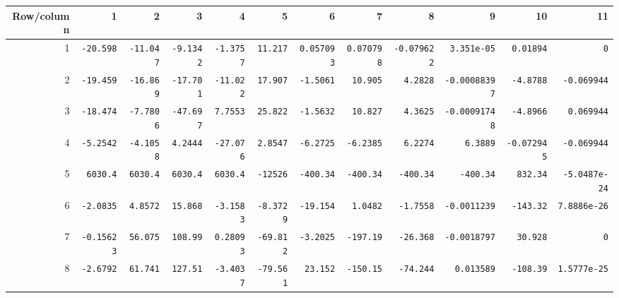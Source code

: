 \begin{landscape}
\begingroup\scriptsize\setlength{\tabcolsep}{3pt}\centering
\begin{tabular}{rrrrrrrrrrrr}\toprule

Row/column & 1 & 2 & 3 & 4 & 5 & 6 & 7 & 8 & 9 & 10 & 11 \\ \midrule

1 & \texttt{-20.598} & \texttt{-11.047} & \texttt{-9.1342} & \texttt{-1.3757} & \texttt{11.217} & \texttt{0.057093} & \texttt{0.070798} & \texttt{-0.079622} & \texttt{3.351e-05} & \texttt{0.01894} & \texttt{0} \\

2 & \texttt{-19.459} & \texttt{-16.869} & \texttt{-17.701} & \texttt{-11.022} & \texttt{17.907} & \texttt{-1.5061} & \texttt{10.905} & \texttt{4.2828} & \texttt{-0.00088397} & \texttt{-4.8788} & \texttt{-0.069944} \\

3 & \texttt{-18.474} & \texttt{-7.7806} & \texttt{-47.697} & \texttt{7.7553} & \texttt{25.822} & \texttt{-1.5632} & \texttt{10.827} & \texttt{4.3625} & \texttt{-0.00091748} & \texttt{-4.8966} & \texttt{0.069944} \\

4 & \texttt{-5.2542} & \texttt{-4.1058} & \texttt{4.2444} & \texttt{-27.076} & \texttt{2.8547} & \texttt{-6.2725} & \texttt{-6.2385} & \texttt{6.2274} & \texttt{6.3889} & \texttt{-0.072945} & \texttt{-0.069944} \\

5 & \texttt{6030.4} & \texttt{6030.4} & \texttt{6030.4} & \texttt{6030.4} & \texttt{-12526} & \texttt{-400.34} & \texttt{-400.34} & \texttt{-400.34} & \texttt{-400.34} & \texttt{832.34} & \texttt{-5.0487e-24} \\

6 & \texttt{-2.0835} & \texttt{4.8572} & \texttt{15.868} & \texttt{-3.1583} & \texttt{-8.3729} & \texttt{-19.154} & \texttt{1.0482} & \texttt{-1.7558} & \texttt{-0.0011239} & \texttt{-143.32} & \texttt{7.8886e-26} \\

7 & \texttt{-0.15623} & \texttt{56.075} & \texttt{108.99} & \texttt{0.28093} & \texttt{-69.812} & \texttt{-3.2025} & \texttt{-197.19} & \texttt{-26.368} & \texttt{-0.0018797} & \texttt{30.928} & \texttt{0} \\

8 & \texttt{-2.6792} & \texttt{61.741} & \texttt{127.51} & \texttt{-3.4037} & \texttt{-79.561} & \texttt{23.152} & \texttt{-150.15} & \texttt{-74.244} & \texttt{0.013589} & \texttt{-108.39} & \texttt{1.5777e-25} \\


\end{tabular}
\end{landscape}

